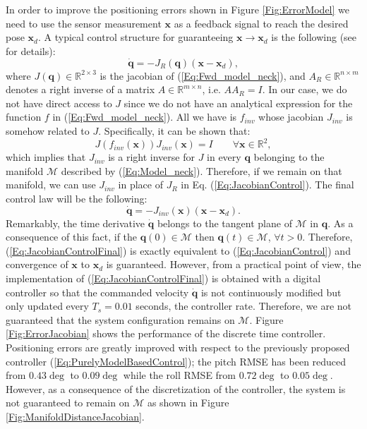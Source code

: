 \documentclass[conference]{IEEEtran}
\numberwithin{equation}{section}
\newcommand{\q}{\mathbf{q}}
\newcommand{\x}{\mathbf{x}}
\begin{document}
In order to improve the positioning errors shown in Figure \ref{Fig:ErrorModel} we need to use the sensor measurement $\x$ as a feedback signal to reach the desired pose $\x_d$. A typical control structure for guaranteeing $\x \rightarrow \x_d$ is the following (see \cite{SamsonEspiau} for details):
\begin{equation} \label{Eq:JacobianControl}
\dot{\q} = - J_R(\q) (\x - \x_d),
\end{equation}
where $J(\q) \in \mathbb R^{2 \times 3}$ is the jacobian of (\ref{Eq:Fwd_model_neck}), and $A_R \in \mathbb R^{n \times m}$ denotes a right inverse of a matrix $A \in \mathbb R^{m \times n}$, i.e. $A A_R = I$. In our case, we do not have direct access to $J$ since we do not have an analytical expression for the function $f$ in (\ref{Eq:Fwd_model_neck}). All we have is $f_{inv}$ whose jacobian $J_{inv}$ is somehow related to $J$. Specifically, it can be shown that:
\begin{equation} \label{Eq:JacobianInv}
J(f_{inv}(\x)) J_{inv} (\x) = I \qquad \forall \x \in \mathbb R^2,
\end{equation}
which implies that $J_{inv}$ is a right inverse for  $J$ in every $\q$ belonging to the manifold $\mathcal M$ described by (\ref{Eq:Model_neck}). Therefore, if we remain on that manifold, we can use $J_{inv}$ in place of $J_R$ in Eq. (\ref{Eq:JacobianControl}). The final control law will be the following:
\begin{equation} \label{Eq:JacobianControlFinal}
\dot{\q} = - J_{inv}(\x) (\x - \x_d).
\end{equation}
Remarkably, the time derivative $\dot{\q}$ belongs to the tangent plane of $\mathcal M$ in $\mathbf q$. As a consequence of this fact, if the $\q(0) \in \mathcal M$ then $\q(t) \in \mathcal M$, $\forall t > 0$. Therefore, (\ref{Eq:JacobianControlFinal}) is exactly equivalent to (\ref{Eq:JacobianControl}) and convergence of $\x$ to $\x_d$ is guaranteed. However, from a practical point of view, the implementation of (\ref{Eq:JacobianControlFinal}) is obtained with a digital controller so that the commanded velocity $\dot{\q}$ is not continuously modified but only updated every $T_s = 0.01$ seconds, the controller rate. Therefore, we are not guaranteed that the system configuration remains on $\mathcal{M}$. Figure \ref{Fig:ErrorJacobian} shows the performance of the discrete time controller. Positioning errors are greatly improved with respect to the previously proposed controller (\ref{Eq:PurelyModelBasedControl}); the pitch RMSE has been reduced from $0.43 \deg$ to $0.09 \deg$ while the roll RMSE from $0.72 \deg$ to $0.05 \deg$. However, as a consequence of the discretization of the controller, the system is not guaranteed to remain on $\mathcal M$ as shown in Figure \ref{Fig:ManifoldDistanceJacobian}. 
\end{document}

